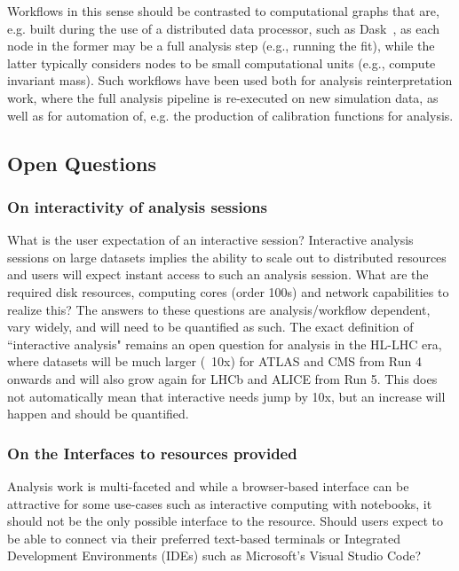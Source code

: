 Workflows in this sense should be contrasted to computational graphs that are, e.g. built during the use of a distributed data processor, such as Dask~\cite{dask}, as each node in the former may be a full analysis step (e.g., running the fit), while the latter typically considers nodes to be small computational units (e.g., compute invariant mass). Such workflows have been used both for analysis reinterpretation work, where the full analysis pipeline is re-executed on new simulation data, as well as for automation of, e.g. the production of calibration functions for analysis. 

\subsection*{Open Questions}

\subsubsection*{On interactivity of analysis sessions}
What is the user expectation of an interactive session? Interactive analysis sessions on large datasets implies the ability to scale out to distributed resources and users will expect instant access to such an analysis session. What are the required disk resources, computing cores (order 100s) and network capabilities to realize this? The answers to these questions are analysis/workflow dependent, vary widely, and will need to be quantified as such. The exact definition of ``interactive analysis" remains an open question for analysis in the HL-LHC era, where datasets will be much larger (~10x) for ATLAS and CMS from Run 4 onwards and will also grow again for LHCb and ALICE from Run 5. This does not automatically mean that interactive needs jump by 10x, but an increase will happen and should be quantified.

\subsubsection*{On the Interfaces to resources provided}
Analysis work is multi-faceted and while a browser-based interface can be attractive for some use-cases such as interactive computing with notebooks, it should not be the only possible interface to the resource. Should users expect to be able to connect via their preferred text-based terminals or Integrated Development Environments (IDEs) such as Microsoft's Visual Studio Code? 



